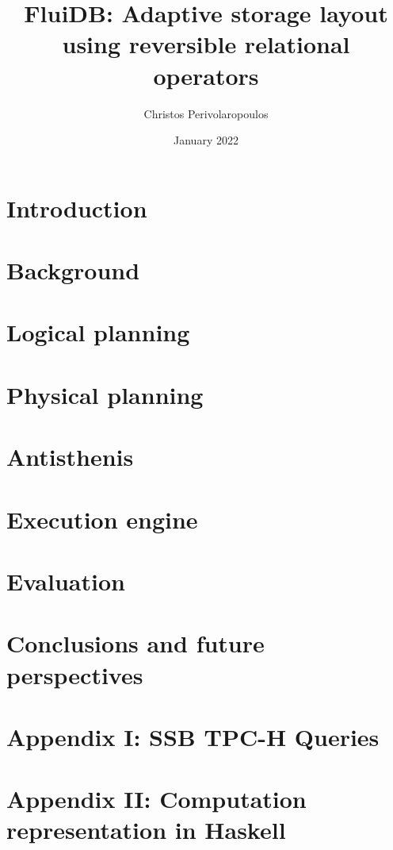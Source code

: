 \documentclass[fontsize=12pt,paper=letter,twosided,cleardoublepage=plain,final]{scrbook}
\title{FluiDB: Adaptive storage layout using reversible relational operators}
\author{Christos Perivolaropoulos}
\date{January 2022}
\begin{document}
\frontmatter


\mainmatter

\chapter{Introduction}
\label{chapter:introduction}


\chapter{Background}
\label{chapter:background}


\chapter{Logical planning}
\label{chapter:fluidb_logical_planning}


\chapter{Physical planning}
\label{chapter:physical_planning}


\chapter{Antisthenis}
\label{chapter:antisthenis}


\chapter{Execution engine}
\label{chapter:execution_engine}


\chapter{Evaluation}
\label{chapter:evaluation}


\chapter{Conclusions and future perspectives}
\label{chapter:conclusion}


\appendix
\chapter{Appendix I: SSB TPC-H Queries}
\label{chapter:appendix}


\chapter{Appendix II: Computation representation in Haskell}
\label{chapter:appendix2}


\begin{spacing}{1}
\printbibliography
\end{spacing}

\backmatter
\end{document}
